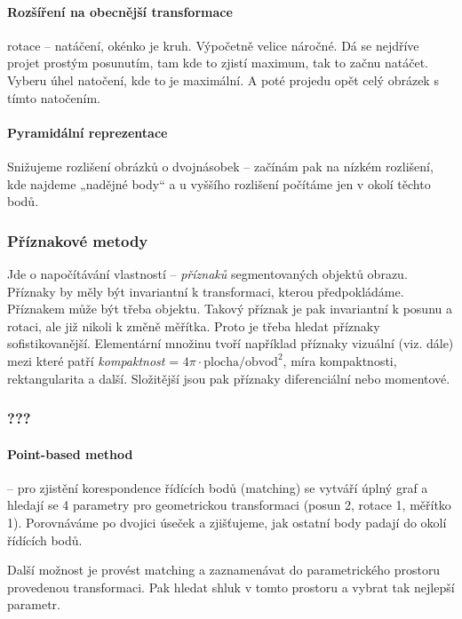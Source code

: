 \paragraph{Rozšíření na obecnější transformace} rotace -- natáčení, okénko je kruh. Výpočetně velice náročné. Dá se nejdříve projet prostým posunutím, tam kde to zjistí maximum, tak to začnu natáčet. Vyberu úhel natočení, kde to je maximální. A poté projedu opět celý obrázek s tímto natočením.

\paragraph{Pyramidální reprezentace}
Snižujeme rozlišení obrázků o dvojnásobek -- začínám pak na nízkém rozlišení, kde najdeme „nadějné body“ a u vyššího rozlišení počítáme jen v okolí těchto bodů.


\subsubsection{Příznakové metody}

Jde o napočítávání vlastností -- \emph{příznaků} segmentovaných objektů obrazu. Příznaky by měly být invariantní k transformaci, kterou předpokládáme. Příznakem může být třeba  objektu. Takový příznak je pak invariantní k posunu a rotaci, ale již nikoli k změně měřítka. Proto je třeba hledat příznaky sofistikovanější. Elementární množinu tvoří například příznaky vizuální (viz. dále) mezi které patří \emph{kompaktnost} = $ 4\pi \cdot \text{plocha} / \text{obvod}^2$, míra kompaktnosti, rektangularita a další. Složitější jsou pak příznaky diferenciální nebo momentové.

\subsubsection{???}

\paragraph{Point-based method} -- pro zjistění korespondence řídících bodů (matching) se vytváří úplný graf a hledají se 
4 parametry pro geometrickou transformaci (posun 2, rotace 1, měřítko 1). Porovnáváme po dvojici úseček a zjišťujeme,
jak ostatní body padají do okolí řídících bodů.

Další možnost je provést matching a zaznamenávat do parametrického prostoru provedenou transformaci. Pak hledat shluk
v tomto prostoru a vybrat tak nejlepší parametr.

